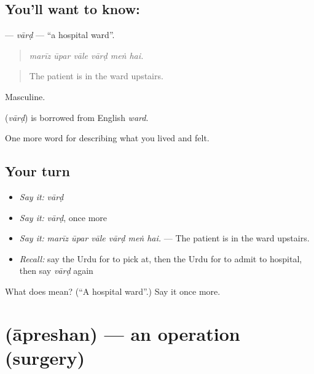 \subsection*{You'll want to know: }
\textbf{} — \emph{vārḍ} — \textquotedblleft{}a hospital ward\textquotedblright{}.

\begin{quote}
     
\end{quote}

\begin{quote}
\emph{marīz ūpar vāle vārḍ meṅ hai.}
\end{quote}

\begin{quote}
The patient is in the ward upstairs.
\end{quote}

Masculine.

\begin{cousinweb}
\textbf{} (\emph{vārḍ}) is borrowed from English \emph{ward}.
\end{cousinweb}

\begin{grammarlens}[title={What you've built}]
One more word for describing what you lived and felt.
\end{grammarlens}

\subsection*{Your turn}
\begin{itemize}
\raggedright
  \item \emph{Say it:} \emph{vārḍ}
  \item \emph{Say it:} \emph{vārḍ}, once more
  \item \emph{Say it:} \emph{marīz ūpar vāle vārḍ meṅ hai.} — The patient is in the ward upstairs.
  \item \emph{Recall:} say the Urdu for to pick at, then the Urdu for to admit to hospital, then say \emph{vārḍ} again
\end{itemize}

\begin{tcolorbox}[breakable,colback=teal!4,colframe=teal!35!black,title={Before you move on}]
What does  mean? (\textquotedblleft{}A hospital ward\textquotedblright{}.) Say it once more.
\end{tcolorbox}
\section[\texorpdfstring{\ur{آپریشن} (āpreshan)}{آپریشن (āpreshan)}]{ (āpreshan) — an operation (surgery)}

